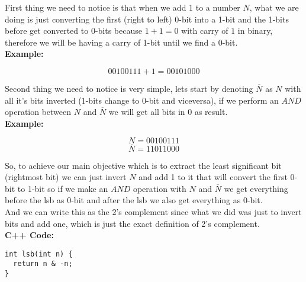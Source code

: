 \vspace{1em}
\sffamily
\bgroup

First thing we need to notice is that when we add 1 to a number $N$, what we are doing is just converting the first (right to left) 0-bit into a 1-bit and
the 1-bits before get converted to 0-bits because $1 + 1 = 0$ with carry of $1$ in binary, therefore we will be having a carry of 1-bit until we find a 0-bit.\\

\textbf{Example:}

$$00100111 + 1 = 00101000$$

Second thing we need to notice is very simple, lets start by denoting $\overline{N}$ as $N$ with all it's bits inverted (1-bits change to 0-bit and viceversa), if we perform an $AND$ operation between $N$ and $\overline{N}$ we will get all bits in $0$ as result.\\

\textbf{Example:}

$$N = 00100111$$
$$\overline{N} = 11011000$$

So, to achieve our main objective which is to extract the least significant bit (rightmost bit) we can just invert $N$ and add 1 to it that will convert the first 0-bit to 1-bit so if we make an $AND$ operation with $N$ and $\overline{N}$ we get everything before the lsb as 0-bit and after the lsb we also get everything as 0-bit.\\

And we can write this as the 2's complement since what we did was just to invert bits and add one, which is just the exact definition of 2's complement.\\

\textbf{C++ Code:}\\
\begin{verbatim}
int lsb(int n) {
  return n & -n;
}
\end{verbatim}


\egroup
\vspace{1em}